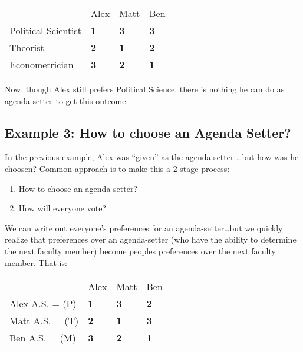 \documentclass{article}
\begin{document}
\begin{table}[h]
\centering
\begin{tabular}{llll}
                                         & Alex                            & Matt                            & Ben                             \\ \cline{2-4} 
\multicolumn{1}{l|}{Political Scientist} & \multicolumn{1}{l|}{\textbf{1}} & \multicolumn{1}{l|}{\textbf{3}} & \multicolumn{1}{l|}{\textbf{3}} \\ \cline{2-4} 
\multicolumn{1}{l|}{Theorist}            & \multicolumn{1}{l|}{\textbf{2}} & \multicolumn{1}{l|}{\textbf{1}} & \multicolumn{1}{l|}{\textbf{2}} \\ \cline{2-4} 
\multicolumn{1}{l|}{Econometrician}      & \multicolumn{1}{l|}{\textbf{3}} & \multicolumn{1}{l|}{\textbf{2}} & \multicolumn{1}{l|}{\textbf{1}} \\ \cline{2-4} 
\end{tabular}
\end{table}

Now, though Alex still prefers Political Science, there is nothing he can do as agenda setter to get this outcome. 

\subsection*{Example 3: How to choose an Agenda Setter?}

In the previous example, Alex was ``given'' as the agenda setter \dots but how was he choosen? 
Common approach is to make this a 2-stage process: 
\begin{enumerate}

\item How to choose an agenda-setter?
\item How will everyone vote? 
\end{enumerate}

We can write out everyone's preferences for an agenda-setter\dots but we quickly realize that preferences over an agenda-setter (who have the ability to determine the next faculty member) become peoples preferences over the next faculty member. That is:

\begin{table}[h]
\centering
\begin{tabular}{llll}
                                         & Alex                            & Matt                            & Ben                             \\ \cline{2-4} 
\multicolumn{1}{l|}{Alex A.S. = (P)} & \multicolumn{1}{l|}{\textbf{1}} & \multicolumn{1}{l|}{\textbf{3}} & \multicolumn{1}{l|}{\textbf{2}} \\ \cline{2-4} 
\multicolumn{1}{l|}{Matt A.S. = (T)}            & \multicolumn{1}{l|}{\textbf{2}} & \multicolumn{1}{l|}{\textbf{1}} & \multicolumn{1}{l|}{\textbf{3}} \\ \cline{2-4} 
\multicolumn{1}{l|}{Ben A.S. = (M)}      & \multicolumn{1}{l|}{\textbf{3}} & \multicolumn{1}{l|}{\textbf{2}} & \multicolumn{1}{l|}{\textbf{1}} \\ \cline{2-4} 
\end{tabular}
\end{table}
\end{document}
